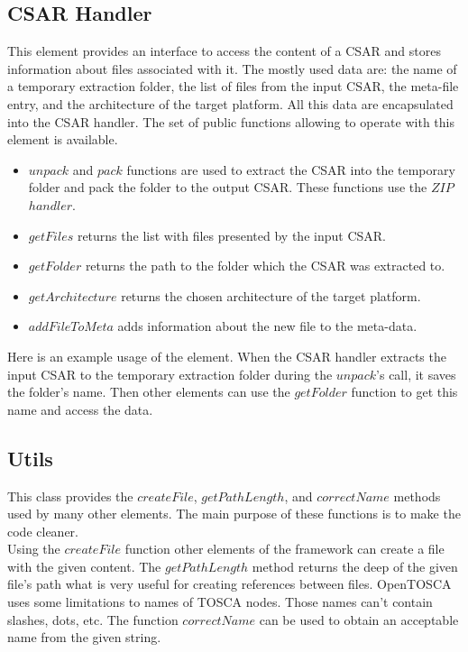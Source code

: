\subsection*{CSAR Handler}
This element provides an interface to access the content of a CSAR and stores information about files associated with it.
The mostly used data are: the name of a temporary extraction folder, the list of files from the input CSAR, the meta-file entry, and the architecture of the target platform.
All this data are encapsulated into the CSAR handler.
The set of public functions allowing to operate with this element is available.
\begin{itemize}
	\item $unpack$ and $pack$ functions are used to extract the CSAR into the temporary folder and pack the folder to the output CSAR. 
	These functions use the $ZIP$~$handler$.
	\item $getFiles$ returns the list with files presented by the input CSAR.
	\item $getFolder$ returns the path to the folder which the CSAR was extracted to.
	\item $getArchitecture$ returns the chosen architecture of the target platform.
	\item $addFileToMeta$ adds information about the new file to the meta-data.
\end{itemize}
Here is an example usage of the element.
When the CSAR handler extracts the input CSAR to the temporary extraction folder during the $unpack$'s call, it saves the folder's name. 
Then other elements can use the $getFolder$ function to get this name and access the data.

\subsection*{Utils}
This class provides the $createFile$, $getPathLength$, and $correctName$ methods used by many other elements.
The main purpose of these functions is to make the code cleaner. \\
Using the $createFile$ function other elements of the framework can create a file with the given content.
The $getPathLength$ method returns the deep of the given file's path what is very useful for creating references between files. %
OpenTOSCA uses some limitations to names of TOSCA nodes. 
Those names can't contain slashes, dots, etc.
The function $correctName$ can be used to obtain an acceptable name from the given string.

